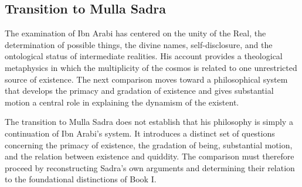 



\subsection{Transition to Mulla Sadra}
\label{subsec:ch08_s16_ss19}

\label{para:VS.B01.P01.C08.S16.SS19.P001}

The examination of Ibn Arabi has centered
on the unity of the Real, the determination
of possible things, the divine names,
self-disclosure, and the ontological
status of intermediate realities. His
account provides a theological metaphysics
in which the multiplicity of the cosmos
is related to one unrestricted source
of existence. The next comparison moves
toward a philosophical system that
develops the primacy and gradation of
existence and gives substantial motion
a central role in explaining the
dynamism of the existent.

\label{para:VS.B01.P01.C08.SS19.P002}

The transition to Mulla Sadra does not
establish that his philosophy is simply
a continuation of Ibn Arabi's system.
It introduces a distinct set of questions
concerning the primacy of existence,
the gradation of being, substantial
motion, and the relation between
existence and quiddity. The comparison
must therefore proceed by reconstructing
Sadra's own arguments and determining
their relation to the foundational
distinctions of Book I.

